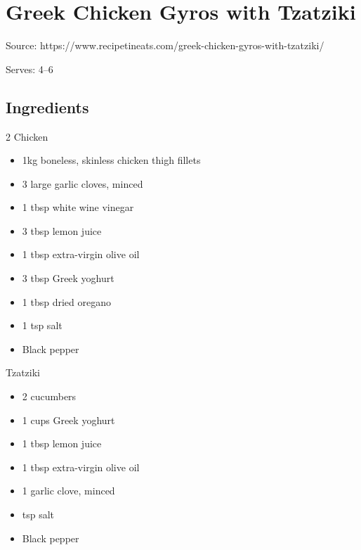 \clearpage
\section{Greek Chicken Gyros with Tzatziki}


Source: https://www.recipetineats.com/greek-chicken-gyros-with-tzatziki/

Serves: 4--6

\subsection{Ingredients}

\begin{multicols}{2}
    Chicken

    \begin{itemize}
        \item 1kg boneless, skinless chicken thigh fillets
        \item 3 large garlic cloves, minced
        \item 1 tbsp white wine vinegar
        \item 3 tbsp lemon juice
        \item 1 tbsp extra-virgin olive oil
        \item 3 tbsp Greek yoghurt
        \item 1 tbsp dried oregano
        \item 1 tsp salt
        \item Black pepper
    \end{itemize}

    Tzatziki

    \begin{itemize}
        \item 2 cucumbers
        \item 1 cups Greek yoghurt
        \item 1 tbsp lemon juice
        \item 1 tbsp extra-virgin olive oil
        \item 1 garlic clove, minced
        \item {} tsp salt
        \item Black pepper
    \end{itemize}

    \columnbreak


\end{multicols}

